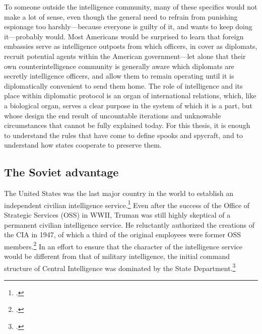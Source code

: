 \documentclass{memoir}
\begin{document}
\begin{refsegment}
To someone outside the intelligence community, many of these specifics would not make a lot of sense, even though the general need to refrain from punishing espionage too harshly---because everyone is guilty of it, and wants to keep doing it---probably would. Most Americans would be surprised to learn that foreign embassies serve as intelligence outposts from which officers, in cover as diplomats, recruit potential agents within the American government---let alone that their own counterintelligence community is generally aware which diplomats are secretly intelligence officers, and allow them to remain operating until it is diplomatically convenient to send them home. The role of intelligence and its place within diplomatic protocol is an organ of international relations, which, like a biological organ, serves a clear purpose in the system of which it is a part, but whose design the end result of uncountable iterations and unknowable circumstances that cannot be fully explained today. For this thesis, it is enough to understand the rules that have come to define spooks and spycraft, and to understand how states cooperate to preserve them.

\subsection{The Soviet advantage}
The United States was the last major country in the world to establish an independent civilian intelligence service.\footcite[p.~35]{olson_fair_2006} Even after the success of the Office of Strategic Services (OSS) in WWII, Truman was still highly skeptical of a permanent civilian intelligence service. He reluctantly authorized the creations of the CIA in 1947, of which a third of the original employees were former OSS members.\footcite[p.~37]{olson_fair_2006} In an effort to ensure that the character of the intelligence service would be different from that of military intelligence, the initial command structure of Central Intelligence was dominated by the State Department.\footcite{troy_truman_1993}


\end{refsegment}
\end{document}
